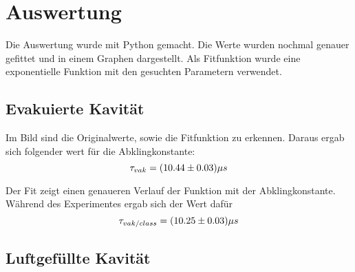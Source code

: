 \section{Auswertung}

Die Auswertung wurde mit Python gemacht. Die Werte wurden nochmal genauer gefittet und in einem Graphen dargestellt. Als Fitfunktion wurde eine exponentielle Funktion mit den gesuchten Parametern verwendet. 

\subsection{Evakuierte Kavität}


Im Bild sind die Originalwerte, sowie die Fitfunktion zu erkennen. Daraus ergab sich folgender wert für die Abklingkonstante:
\begin{equation}
\notag
\tau_{vak}= (10.44 \pm 0.03)\mu s
\end{equation}

Der Fit zeigt einen genaueren Verlauf der Funktion mit der Abklingkonstante. Während des Experimentes ergab sich der Wert dafür 
\begin{equation}
\notag
\tau_{vak/class}= (10.25 \pm 0.03)\mu s
\end{equation}

\subsection{Luftgefüllte Kavität}

